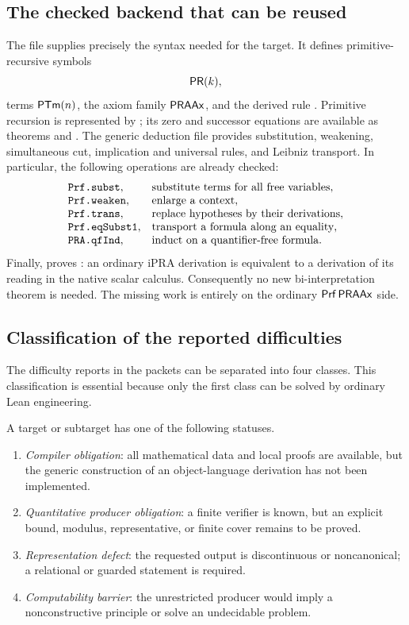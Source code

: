 \subsection{The checked backend that can be reused}

The file  supplies precisely the syntax needed for the target.
It defines primitive-recursive symbols
\[
 \mathsf{PR}(k),
\]
terms \(\mathsf{PTm}(n)\), the axiom family \(\mathsf{PRAAx}\), and the derived rule
.  Primitive recursion is represented by
; its zero and successor equations are available as theorems
 and .  The generic deduction file
provides substitution, weakening, simultaneous cut, implication and universal
rules, and Leibniz transport.  In particular, the following operations are
already checked:
\[
\begin{array}{ll}
\code{Prf.subst}, & \text{substitute terms for all free variables},\\
\code{Prf.weaken},& \text{enlarge a context},\\
\code{Prf.trans}, & \text{replace hypotheses by their derivations},\\
\code{Prf.eqSubst1},& \text{transport a formula along an equality},\\
\code{PRA.qfInd},& \text{induct on a quantifier-free formula}.
\end{array}
\]
Finally,  proves
: an ordinary iPRA derivation is equivalent to a
derivation of its reading in the native scalar calculus.  Consequently no new
bi-interpretation theorem is needed.  The missing work is entirely on the
ordinary \(\mathsf{Prf}\,\mathsf{PRAAx}\) side.

\subsection{Classification of the reported difficulties}

The difficulty reports in the packets can be separated into four classes.
This classification is essential because only the first class can be solved
by ordinary Lean engineering.

\begin{definition}
A target or subtarget has one of the following statuses.
\begin{enumerate}
\item \emph{Compiler obligation}: all mathematical data and local proofs are
available, but the generic construction of an object-language derivation has
not been implemented.
\item \emph{Quantitative producer obligation}: a finite verifier is known,
but an explicit bound, modulus, representative, or finite cover remains to be
proved.
\item \emph{Representation defect}: the requested output is discontinuous or
noncanonical; a relational or guarded statement is required.
\item \emph{Computability barrier}: the unrestricted producer would imply a
nonconstructive principle or solve an undecidable problem.
\end{enumerate}
\end{definition}

